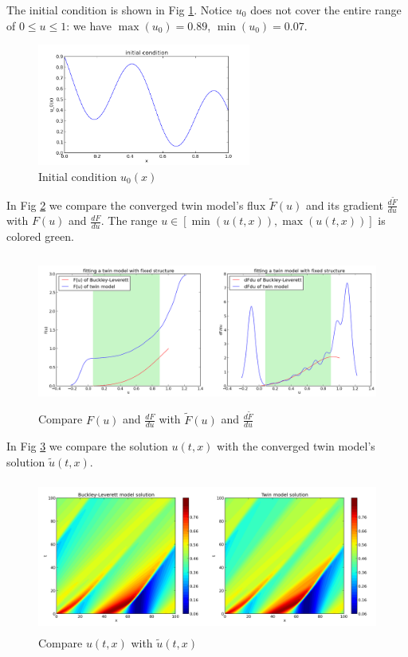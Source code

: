 \documentclass[a4paper,onecolumn]{article}
\theoremstyle{remark}
\begin{document}
\noindent The initial condition is shown in Fig \ref{fig:initial condition}. Notice
$u_0$ does not cover the entire range of 
$0\le u\le 1$: we have $\max(u_0) =0.89$, $\min(u_0) = 0.07$.
\begin{figure}[H]\begin{center}
    \includegraphics[height=4cm]{initial_condition.png}
    \caption{Initial condition $u_0(x)$}
    \label{fig:initial condition}
\end{center}\end{figure}
\noindent In Fig \ref{fig:flux compare} we compare the converged twin model's flux $\tilde{F}(u)$ and its gradient $\frac{d\tilde{F}}{du}$
with $F(u)$ and $\frac{dF}{du}$. The range
$u\in [\min(u(t,x)), \max(u(t,x))]$ is colored green.
\begin{figure}[H]\begin{center}
    \includegraphics[height=5cm]{fit_flux_2.png}
    \caption{Compare $F(u)$ and $\frac{dF}{du}$ with $\tilde{F}(u)$ and $\frac{d\tilde{F}}{du}$}
    \label{fig:flux compare}
\end{center}\end{figure}
\noindent In Fig \ref{fig:sol compare} we compare the solution $u(t,x)$ with the converged
twin model's solution $\tilde{u}(t,x)$.
\begin{figure}[H]\begin{center}
    \includegraphics[height=5cm]{BL_sol.png}
    \caption{Compare $u(t,x)$ with $\tilde{u}(t,x)$}
    \label{fig:sol compare}
\end{center}\end{figure}
\end{document}
